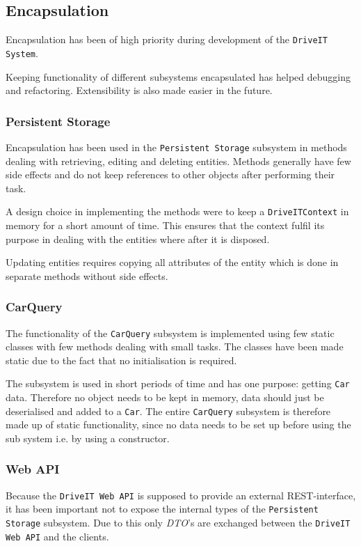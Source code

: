 \subsection{Encapsulation}
Encapsulation has been of high priority during development of the \texttt{DriveIT System}. 

Keeping functionality of different subsystems encapsulated has helped debugging and refactoring. Extensibility is also made easier in the future.
\subsubsection{Persistent Storage}
Encapsulation has been used in the \texttt{Persistent Storage} subsystem in methods dealing with retrieving, editing and deleting entities. Methods generally have few side effects and do not keep references to other objects after performing their task.

A design choice in implementing the methods were to keep a \texttt{DriveITContext} in memory for a short amount of time. This ensures that the context fulfil its purpose in dealing with the entities where after it is disposed.

Updating entities requires copying all attributes of the entity which is done in separate methods without side effects.

\subsubsection{CarQuery}
The functionality of the \texttt{CarQuery} subsystem is implemented using few static classes with few methods dealing with small tasks. The classes have been made static due to the fact that no initialisation is required.

The subsystem is used in short periods of time and has one purpose: getting \texttt{Car} data. Therefore no object needs to be kept in memory, data should just be deserialised and added to a \texttt{Car}. The entire \texttt{CarQuery} subsystem is therefore made up of static functionality, since no data needs to be set up before using the sub system i.e. by using a constructor.

\subsubsection{Web API}
Because the \texttt{DriveIT Web API} is supposed to provide an external REST-interface, it has been important not to expose the internal types of the \texttt{Persistent Storage} subsystem. Due to this only \textit{DTO}'s are exchanged between the \texttt{DriveIT Web API} and the clients.\\

